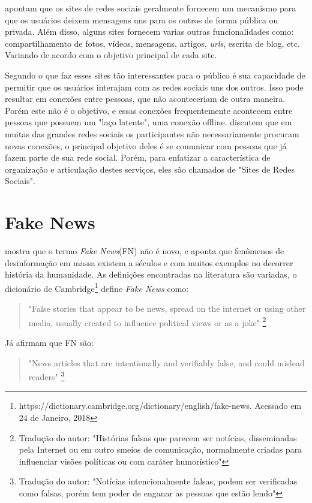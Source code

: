 \cite{boyd_social_2007} apontam que os sites de redes sociais geralmente fornecem um mecanismo para que os usuários deixem mensagens uns para os outros de forma pública ou privada. Além disso, alguns sites fornecem varias outras funcionalidades como: compartilhamento de fotos, vídeos, mensagens, artigos, \emph{urls}, escrita de blog, etc. Variando de acordo com o objetivo principal de cada site.

Segundo \cite{haythornthwaite_social_2005} o que faz esses sites tão interessantes para o público é sua capacidade de permitir que os usuários interajam com as redes sociais uns dos outros. Isso pode resultar em conexões entre pessoas, que não aconteceriam de outra maneira. Porém este não é o objetivo, e essas conexões frequentemente acontecem entre pessoas que possuem um "laço latente", uma conexão offline. \cite{boyd_social_2007} discutem que em muitas das grandes redes sociais os participantes não necessariamente procuram novas conexões, o principal objetivo deles é se comunicar com pessoas que já fazem parte de sua rede social. Porém, para enfatizar a característica de organização e articulação destes serviços, eles são chamados de "Sites de Redes Sociais".


\section{Fake News}

\cite{robert_darnton_true_2017} mostra que o termo \emph{Fake News}(FN) não é novo, e aponta que fenômenos de desinformação em massa existem a séculos e com muitos exemplos no decorrer história da humanidade. As definições encontradas na literatura são variadas, o dicionário de Cambridge\footnote{https://dictionary.cambridge.org/dictionary/english/fake-news. Acessado em 24 de Janeiro, 2018} define \emph{Fake News} como: 

\begin{quote}
    "False stories that appear to be news, spread on the internet or using other media, usually created to influence political views or as a joke"
    \footnote{Tradução do autor: "Histórias falsas que parecem ser notícias, disseminadas pela Internet ou em outro smeios de comunicação, normalmente criadas para influenciar visões políticas ou com caráter humorístico"}
\end{quote}

Já \cite{allcott_social_2017} afirmam que FN são:
\begin{quote}
    "News articles that are intentionally and verifiably false, and could mislead readers"
    \footnote{Tradução do autor: "Notícias intencionalmente falsas, podem ser verificadas como falsas, porém tem poder de enganar as pessoas que estão lendo"}
\end{quote}

